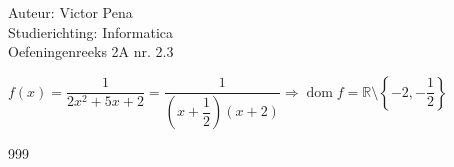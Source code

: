 \documentclass[a4paper]{article}
\begin{document}
	
	\noindent \large Auteur: Victor Pena \\
	\noindent \large Studierichting: Informatica\\
	\noindent \large Oefeningenreeks 2A nr. 2.3\\
	
	\medskip
	
	\normalsize 
	$f(x)=\dfrac{1}{2x^2+5x+2} = \dfrac{1}{
		\left(x+\dfrac{1}{2}\right)(x+2)} \Rightarrow \operatorname{dom}f = \mathbb{R} \setminus \left\{ -2,-\dfrac{1}{2} \right\}$
	
	
	
	
	
	\begin{thebibliography}{999}
	\end{thebibliography}
\end{document}
